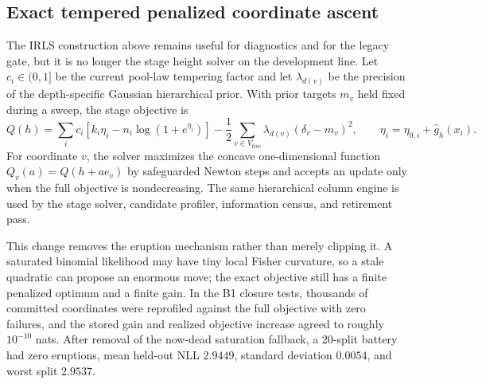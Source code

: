 \documentclass[11pt]{article}
\begin{document}
\subsection{Exact tempered penalized coordinate ascent}\label{sec:exactsolver}
The IRLS construction above remains useful for diagnostics and for the legacy gate, but it is no
longer the stage height solver on the development line. Let $c_i\in(0,1]$ be the current
pool-law tempering factor and let $\lambda_{d(v)}$ be the precision of the depth-specific Gaussian
hierarchical prior. With prior targets $m_v$ held fixed during a sweep, the stage objective is
\begin{equation}\label{eq:exact-objective}
Q(h)=\sum_i c_i\left[k_i\eta_i-n_i\log(1+e^{\eta_i})\right]
-\frac12\sum_{v\in V_{\mathrm{free}}}\lambda_{d(v)}(\delta_v-m_v)^2,
\qquad
\eta_i=\eta_{0,i}+\hat g_h(x_i).
\end{equation}
For coordinate $v$, the solver maximizes the concave one-dimensional function
$Q_v(a)=Q(h+a e_v)$ by safeguarded Newton steps and accepts an update only when the full objective
is nondecreasing. The same hierarchical column engine is used by the stage solver, candidate
profiler, information census, and retirement pass.

This change removes the eruption mechanism rather than merely clipping it. A saturated binomial
likelihood may have tiny local Fisher curvature, so a stale quadratic can propose an enormous move;
the exact objective still has a finite penalized optimum and a finite gain. In the B1 closure tests,
thousands of committed coordinates were reprofiled against the full objective with zero failures,
and the stored gain and realized objective increase agreed to roughly $10^{-10}$ nats. After removal
of the now-dead saturation fallback, a 20-split battery had zero eruptions, mean held-out NLL
$2.9449$, standard deviation $0.0054$, and worst split $2.9537$.
\end{document}
